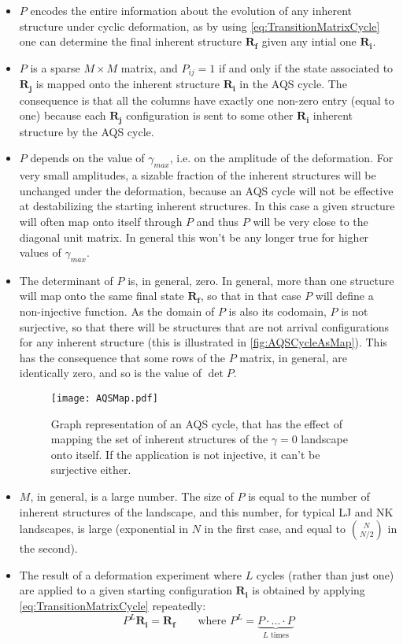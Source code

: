 \begin{itemize}
	\item $P$ encodes the entire information about the evolution of any inherent structure under cyclic deformation, as by using \autoref{eq:TransitionMatrixCycle} one can determine the final inherent structure $\mathbf{R_{f}}$ given any intial one $\mathbf{R_{i}}$.
	\item $P$ is a sparse $M \times M$ matrix, and $P_{ij} = 1$ if and only if the state associated to $\mathbf{R_{j}}$ is mapped onto the inherent structure $\mathbf{R_{i}}$ in the AQS cycle. The consequence is that all the columns have exactly one non-zero entry (equal to one) because each $\mathbf{R_{j}}$ configuration is sent to some other $\mathbf{R_{i}}$ inherent structure by the AQS cycle.
	\item $P$ depends on the value of $\gamma_{max}$, i.e. on the amplitude of the deformation. For very small amplitudes, a sizable fraction of the inherent structures will be unchanged under the deformation, because an AQS cycle will not be effective at destabilizing the starting inherent structures. In this case a given structure will often map onto itself through $P$ and thus $P$ will be very close to the diagonal unit matrix. In general this won't be any longer true for higher values of $\gamma_{max}$.
	\item The determinant of $P$ is, in general, zero. In general, more than one structure will map onto the same final state $\mathbf{R_{f}}$, so that in that case $P$ will define a non-injective function. As the domain of $P$ is also its codomain, $P$ is not surjective, so that there will be structures that are not arrival configurations for any inherent structure (this is illustrated in \autoref{fig:AQSCycleAsMap}). This has the consequence that some rows of the $P$ matrix, in general, are identically zero, and so is the value of $\det P$.
	
	\begin{figure}
	\centering 
	\texttt{[image: AQSMap.pdf]} 
	\caption{Graph representation of an AQS cycle, that has the effect of mapping the set of inherent structures of the $\gamma = 0$ landscape onto itself. If the application is not injective, it can't be surjective either.\label{fig:AQSCycleAsMap}}
	\end{figure}
	
	\item $M$, in general, is a large number. The size of $P$ is equal to the number of inherent structures of the landscape, and this number, for typical LJ and NK landscapes, is large (exponential in $N$ in the first case, and equal to $\binom{N}{N/2}$ in the second).
	\item The result of a deformation experiment where $L$ cycles (rather than just one) are applied to a given starting configuration $\mathbf{R_{i}}$ is obtained by applying \autoref{eq:TransitionMatrixCycle} repeatedly:
	\begin{equation}
		P^{L} \mathbf{R_{i}} = \mathbf{R_{f}} \qquad \text{where } P^{L} = \underbrace{P \cdot \ldots \cdot P}_{L\text{ times}}
	\end{equation} 
\end{itemize}

